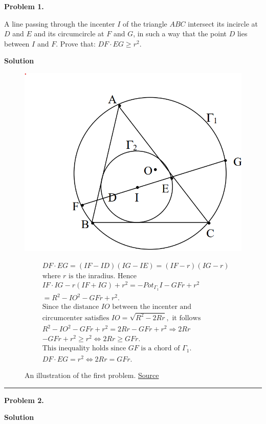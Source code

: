 \documentclass{article}
\begin{document}
  {\centering \textbf{Problem 1.} \par}
  A line passing through the incenter $I$ of the triangle $ABC$ intersect
  its incircle at $D$ and $E$ and its circumcircle at $F$ and $G$, in such
  a way that the point $D$ lies between $I$ and $F$. Prove that:
  $DF \cdot EG \geq r^{2}$.

  \medskip

  {\centering \textbf{Solution} \par}
  \begin{figure}[h]
    \centering
    \begin{minipage}{0.4\textwidth}
      \includegraphics[width=\linewidth]{first.png}
      \caption{An illustration of the first problem. \href{https://www.obm.org.br/content/uploads/2017/01/eixos-2.pdf}{Source}}
    \end{minipage}
    \hfill
    \begin{minipage}{0.5\textwidth}
      \begin{align*}
        &DF \cdot EG = (IF - ID)(IG - IE) = (IF - r)(IG - r) \\
        &\text{where } r \text{ is the inradius. Hence} \\
        &IF \cdot IG - r(IF + IG) + r^2 = - Pot_{\Gamma_{1}} I - GFr + r^2 \\
        &= R^2 - IO^2 - GFr + r^2. \\
        &\text{Since the distance } IO \text{ between the incenter and} \\
        &\text{circumcenter satisfies } IO = \sqrt{R^2 - 2Rr}, \text{ it follows} \\
        &R^2 - IO^2 - GFr + r^2 = 2Rr - GFr + r^2 \Rightarrow 2Rr \\
        &- GFr + r^2 \geq r^2 \iff 2R r \geq GFr. \\
        &\text{This inequality holds since } GF \text{ is a chord of } \Gamma_1. \\
        &DF \cdot EG = r^2 \iff 2Rr = GFr.
      \end{align*}
    \end{minipage}
  \end{figure}

  \rule{\linewidth}{0.4pt}

  {\centering \textbf{Problem 2.} \par}

  \medskip

  {\centering \textbf{Solution} \par}
\end{document}

